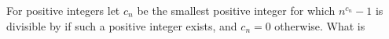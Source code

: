 For positive integers  let $c_n$ be the smallest positive integer for which $n^{c_n}-1$ is divisible by  if such a positive integer exists, and $c_n = 0$ otherwise. What is 